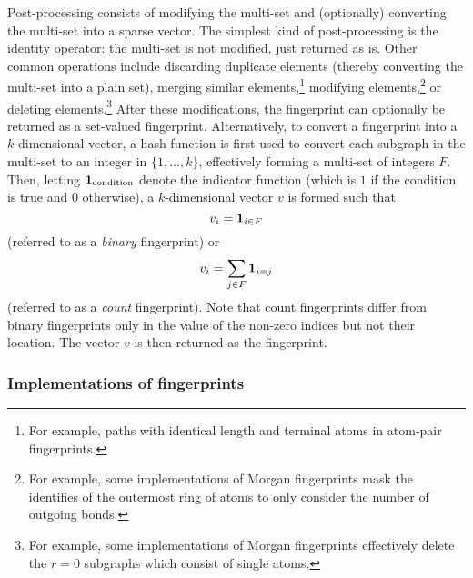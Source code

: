 Post-processing consists of modifying the multi-set
and (optionally) converting the multi-set into a sparse vector.
The simplest kind of post-processing is the identity operator:
the multi-set is not modified, just returned as is.
Other common operations include discarding duplicate elements (thereby converting the multi-set into a plain set),
merging similar elements,\footnote{For example, paths with identical length and terminal atoms in atom-pair fingerprints.}
modifying elements,\footnote{For example, some implementations of Morgan fingerprints mask the identifies of the outermost ring of atoms to only consider the number of outgoing bonds.}
or deleting elements.\footnote{For example, some implementations of Morgan fingerprints effectively delete the $r=0$ subgraphs which consist of single atoms.}
After these modifications, the fingerprint can optionally be returned as a set-valued fingerprint.
Alternatively, to convert a fingerprint into a $k$-dimensional vector,
a hash function is first used to convert each subgraph in the multi-set to an integer in $\{1,\ldots,k\}$,
effectively forming a multi-set of integers $F$.
Then,
letting $\bm{1}_{\text{condition}}$ denote the indicator function (which is $1$ if the condition is true and $0$ otherwise),
a $k$-dimensional vector $v$ is formed such that
\begin{equation*}
    v_i=\bm{1}_{ i \in F }  
\end{equation*}
(referred to as a \emph{binary} fingerprint)
or
\begin{equation*}
    v_i=\sum_{j\in F} \bm{1}_{i = j}
\end{equation*}
(referred to as a \emph{count} fingerprint).
Note that count fingerprints differ from binary fingerprints only in the value of the non-zero indices
but not their location.
The vector $v$ is then returned as the fingerprint.

\subsubsection{Implementations of fingerprints}


